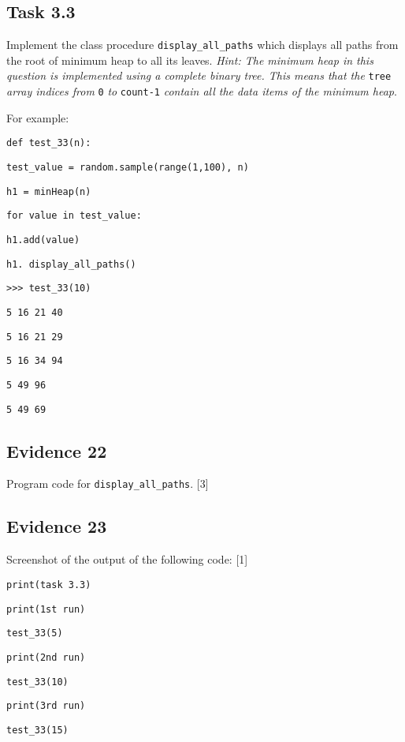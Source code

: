 \subsection*{Task 3.3 }

Implement the class procedure \texttt{display\_all\_paths} which displays
all paths from the root of minimum heap to all its leaves. \emph{Hint:
The minimum heap in this question is implemented using a complete
binary tree. This means that the }\texttt{tree}\emph{ array indices
from }\texttt{0}\emph{ to }\texttt{count-1}\emph{ contain all the
data items of the minimum heap}. 

For example: 

\noindent %
\noindent\begin{minipage}[t]{1\columnwidth}%
\texttt{def test\_33(n):}

\texttt{\qquad{}test\_value = random.sample(range(1,100), n) }

\texttt{\qquad{}h1 = minHeap(n)}

\texttt{\qquad{}for value in test\_value: }

\texttt{\qquad{}\qquad{}h1.add(value) }

\texttt{\qquad{}h1. display\_all\_paths() }

\texttt{>\textcompwordmark >\textcompwordmark > test\_33(10) }

\texttt{5 16 21 40 }

\texttt{5 16 21 29 }

\texttt{5 16 34 94 }

\texttt{5 49 96 }

\texttt{5 49 69 }%
\end{minipage}

\subsection*{Evidence 22 }

Program code for \texttt{display\_all\_paths}. \hfill{} {[}3{]}

\subsection*{Evidence 23 }

Screenshot of the output of the following code: \hfill{}{[}1{]}

\noindent %
\noindent\begin{minipage}[t]{1\columnwidth}%
\texttt{print(\textquotedbl task 3.3\textquotedbl ) }

\texttt{print(\textquotedbl 1st run\textquotedbl ) }

\texttt{test\_33(5)}

\texttt{print(\textquotedbl 2nd run\textquotedbl )}

\texttt{test\_33(10)}

\texttt{print(\textquotedbl 3rd run\textquotedbl )}

\texttt{test\_33(15) }%
\end{minipage}